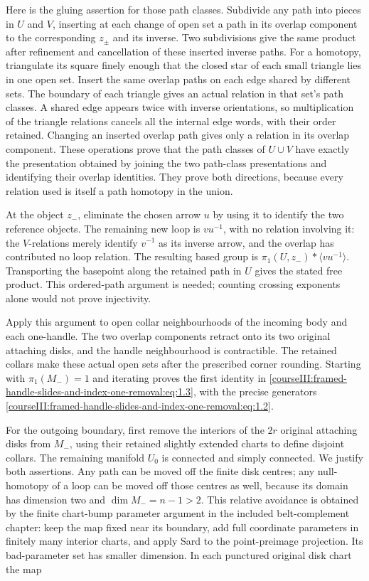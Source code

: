 Here is the gluing assertion for those path classes. Subdivide any path into pieces in \(U\) and \(V\), inserting at each change of open set a path in its overlap component to the corresponding \(z_\pm\) and its inverse. Two subdivisions give the same product after refinement and cancellation of these inserted inverse paths. For a homotopy, triangulate its square finely enough that the closed star of each small triangle lies in one open set. Insert the same overlap paths on each edge shared by different sets. The boundary of each triangle gives an actual relation in that set's path classes. A shared edge appears twice with inverse orientations, so multiplication of the triangle relations cancels all the internal edge words, with their order retained. Changing an inserted overlap path gives only a relation in its overlap component. These operations prove that the path classes of \(U\cup V\) have exactly the presentation obtained by joining the two path-class presentations and identifying their overlap identities. They prove both directions, because every relation used is itself a path homotopy in the union.

At the object \(z_-\), eliminate the chosen arrow \(u\) by using it to identify the two reference objects. The remaining new loop is \(vu^{-1}\), with no relation involving it: the \(V\)-relations merely identify \(v^{-1}\) as its inverse arrow, and the overlap has contributed no loop relation. The resulting based group is \(\pi_1(U,z_-)*\langle vu^{-1}\rangle\). Transporting the basepoint along the retained path in \(U\) gives the stated free product. This ordered-path argument is needed; counting crossing exponents alone would not prove injectivity.

Apply this argument to open collar neighbourhoods of the incoming body and each one-handle. The two overlap components retract onto its two original attaching disks, and the handle neighbourhood is contractible. The retained collars make these actual open sets after the prescribed corner rounding. Starting with \(\pi_1(M_-)=1\) and iterating proves the first identity in \eqref{courseIII:framed-handle-slides-and-index-one-removal:eq:1.3}, with the precise generators \eqref{courseIII:framed-handle-slides-and-index-one-removal:eq:1.2}.

For the outgoing boundary, first remove the interiors of the \(2r\) original attaching disks from \(M_-\), using their retained slightly extended charts to define disjoint collars. The remaining manifold \(U_0\) is connected and simply connected. We justify both assertions. Any path can be moved off the finite disk centres; any null-homotopy of a loop can be moved off those centres as well, because its domain has dimension two and \(\dim M_-=n-1>2\). This relative avoidance is obtained by the finite chart-bump parameter argument in the included belt-complement chapter: keep the map fixed near its boundary, add full coordinate parameters in finitely many interior charts, and apply Sard to the point-preimage projection. Its bad-parameter set has smaller dimension. In each punctured original disk chart the map

